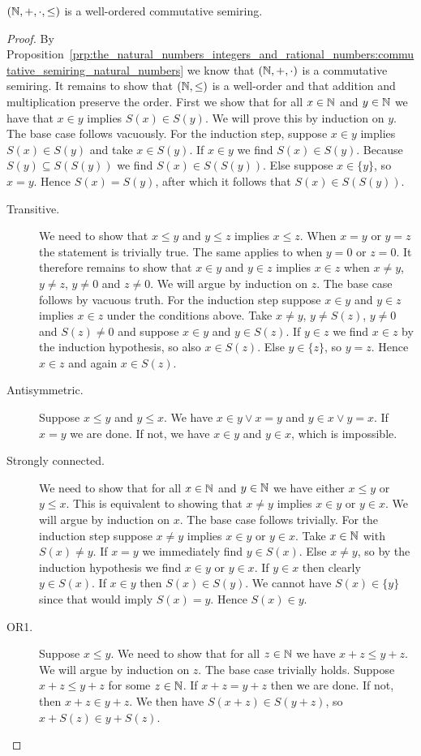 \documentclass[../main.tex]{subfiles}
\begin{document}
\begin{proposition}\label{prp:the_natural_numbers_integers_and_rational_numbers:well_ordered_commutative_semiring_natural_numbers}
    $(\mathbb{N},+,\cdot,\leq)$ is a well-ordered commutative semiring.
\end{proposition}
\begin{proof}
    By Proposition~\ref{prp:the_natural_numbers_integers_and_rational_numbers:commutative_semiring_natural_numbers} we know that $(\mathbb{N},+,\cdot)$ is a commutative semiring. It remains to show that $(\mathbb{N},\leq)$ is a well-order and that addition and multiplication preserve the order. First we show that for all $x\in\mathbb{N}$ and $y\in\mathbb{N}$ we have that $x\in y$ implies $S(x)\in S(y)$. We will prove this by induction on $y$. The base case follows vacuously. For the induction step, suppose $x\in y$ implies $S(x)\in S(y)$ and take $x\in S(y)$. If $x\in y$ we find $S(x)\in S(y)$. Because $S(y)\subseteq S(S(y))$ we find $S(x)\in S(S(y))$. Else suppose $x\in\{y\}$, so $x=y$. Hence $S(x)=S(y)$, after which it follows that $S(x)\in S(S(y))$.
    \begin{description}
        \item[Transitive.] We need to show that $x\leq y$ and $y\leq z$ implies $x\leq z$. When $x=y$ or $y=z$ the statement is trivially true. The same applies to when $y=0$ or $z=0$. It therefore remains to show that $x\in y$ and $y\in z$ implies $x\in z$ when $x\neq y$, $y\neq z$, $y\neq0$ and $z\neq0$. We will argue by induction on $z$. The base case follows by vacuous truth. For the induction step suppose $x\in y$ and $y\in z$ implies $x\in z$ under the conditions above. Take $x\neq y$, $y\neq S(z)$, $y\neq0$ and $S(z)\neq0$ and suppose $x\in y$ and $y\in S(z)$. If $y\in z$ we find $x\in z$ by the induction hypothesis, so also $x\in S(z)$. Else $y\in\{z\}$, so $y=z$. Hence $x\in z$ and again $x\in S(z)$.
        \item[Antisymmetric.] Suppose $x\leq y$ and $y\leq x$. We have $x\in y\lor x=y$ and $y\in x\lor y=x$. If $x=y$ we are done. If not, we have $x\in y$ and $y\in x$, which is impossible.
        \item[Strongly connected.] We need to show that for all $x\in\mathbb{N}$ and $y\in\mathbb{N}$ we have either $x\leq y$ or $y\leq x$. This is equivalent to showing that $x\neq y$ implies $x\in y$ or $y\in x$. We will argue by induction on $x$. The base case follows trivially. For the induction step suppose $x\neq y$ implies $x\in y$ or $y\in x$. Take $x\in\mathbb{N}$ with $S(x)\neq y$. If $x=y$ we immediately find $y\in S(x)$. Else $x\neq y$, so by the induction hypothesis we find $x\in y$ or $y\in x$. If $y\in x$ then clearly $y\in S(x)$. If $x\in y$ then $S(x)\in S(y)$. We cannot have $S(x)\in\{y\}$ since that would imply $S(x)=y$. Hence $S(x)\in y$.
        \item[OR1.] Suppose $x\leq y$. We need to show that for all $z\in\mathbb{N}$ we have $x+z\leq y+z$. We will argue by induction on $z$. The base case trivially holds. Suppose $x+z\leq y+z$ for some $z\in\mathbb{N}$. If $x+z=y+z$ then we are done. If not, then $x+z\in y+z$. We then have $S(x+z)\in S(y+z)$, so $x+S(z)\in y+S(z)$.


\end{description}
\end{proof}
\end{document}
